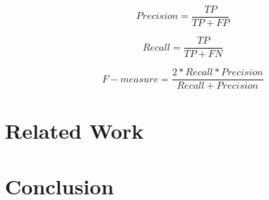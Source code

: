 \documentclass{acm_proc_article-sp}
\begin{document}
\begin{equation}
Precision = \frac{TP}{TP+FP}
\end{equation}

\begin{equation}
Recall = \frac{TP}{TP+FN}
\end{equation}

\begin{equation}
F-measure = \frac{2*Recall*Precision}{Recall+Precision}
\end{equation}


\section{Related Work} \label{related}


\section{Conclusion} \label{conclusion}




%

%
%
\end{document}
